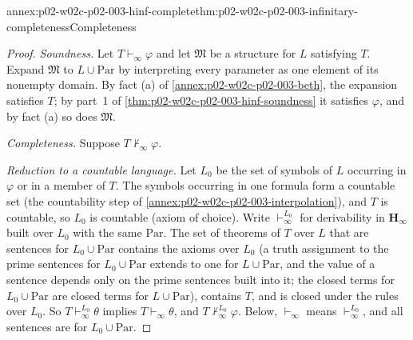 \begin{annexitem}{annex:p02-w02c-p02-003-hinf-complete}{thm:p02-w02c-p02-003-infinitary-completeness}{Completeness}
\begin{proof}
\emph{Soundness.}  Let \(T\vdash_{\infty}\varphi\) and let \(\mathfrak M\)
be a structure for \(L\) satisfying \(T\).  Expand \(\mathfrak M\) to
\(L\cup\mathrm{Par}\) by interpreting every parameter as one element of
its nonempty domain.  By fact (a) of \cref{annex:p02-w02c-p02-003-beth},
the expansion satisfies \(T\); by part~1 of
\cref{thm:p02-w02c-p02-003-hinf-soundness} it satisfies \(\varphi\), and by
fact (a) so does \(\mathfrak M\).

\emph{Completeness.}  Suppose \(T\nvdash_{\infty}\varphi\).

\emph{Reduction to a countable language.}  Let \(L_0\) be the set of
symbols of \(L\) occurring in \(\varphi\) or in a member of \(T\).  The
symbols occurring in one formula form a countable set (the countability
step of \cref{annex:p02-w02c-p02-003-interpolation}), and \(T\) is
countable, so \(L_0\) is countable (axiom of choice).  Write
\(\vdash_{\infty}^{L_0}\) for derivability in \(\mathbf H_{\infty}\) built
over \(L_0\) with the same \(\mathrm{Par}\).  The set of theorems of \(T\)
over \(L\) that are sentences for \(L_0\cup\mathrm{Par}\) contains the
axioms over \(L_0\) (a truth assignment to the prime sentences for
\(L_0\cup\mathrm{Par}\) extends to one for \(L\cup\mathrm{Par}\), and the
value of a sentence depends only on the prime sentences built into it; the
closed terms for \(L_0\cup\mathrm{Par}\) are closed terms for
\(L\cup\mathrm{Par}\)), contains \(T\), and is closed under the rules over
\(L_0\).  So \(T\vdash_{\infty}^{L_0}\theta\) implies
\(T\vdash_{\infty}\theta\), and \(T\nvdash_{\infty}^{L_0}\varphi\).  Below,
\(\vdash_{\infty}\) means \(\vdash_{\infty}^{L_0}\), and all sentences are
for \(L_0\cup\mathrm{Par}\).


\end{proof}
\end{annexitem}
